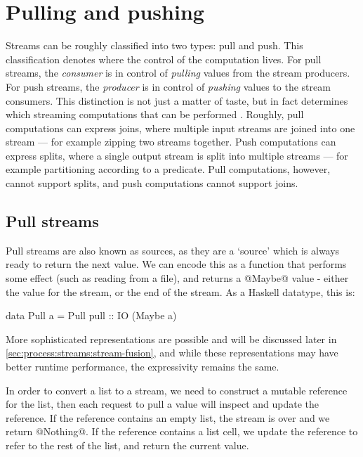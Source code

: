 \chapter{Pulling and pushing}
\label{chapter:process:streams}

Streams can be roughly classified into two types: pull and push.
This classification denotes where the control of the computation lives.
For pull streams, the \emph{consumer} is in control of \emph{pulling} values from the stream producers.
For push streams, the \emph{producer} is in control of \emph{pushing} values to the stream consumers.
This distinction is not just a matter of taste, but in fact determines which streaming computations that can be performed \citep{kay2009you}.
Roughly, pull computations can express joins, where multiple input streams are joined into one stream --- for example zipping two streams together.
Push computations can express splits, where a single output stream is split into multiple streams --- for example partitioning according to a predicate.
Pull computations, however, cannot support splits, and push computations cannot support joins.

\section{Pull streams}
Pull streams are also known as sources, as they are a `source' which is always ready to return the next value.
We can encode this as a function that performs some effect (such as reading from a file), and returns a @Maybe@ value - either the value for the stream, or the end of the stream.
As a Haskell datatype, this is:

\begin{code}
data Pull a
  = Pull
  { pull :: IO (Maybe a) }
\end{code}

More sophisticated representations are possible and will be discussed later in \autoref{sec:process:streams:stream-fusion}, and while these representations may have better runtime performance, the expressivity remains the same.

In order to convert a list to a stream, we need to construct a mutable reference for the list, then each request to pull a value will inspect and update the reference.
If the reference contains an empty list, the stream is over and we return @Nothing@. If the reference contains a list cell, we update the reference to refer to the rest of the list, and return the current value.


